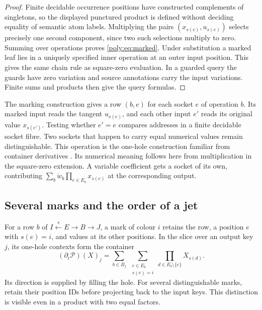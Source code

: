 \documentclass[11pt,a4paper]{article}
\theoremstyle{definition}
\theoremstyle{remark}\newaliascnt{remark}{theorem}
\numberwithin{equation}{section}
\begin{document}
\begin{proof}
Finite decidable occurrence positions have constructed complements
of singletons, so the displayed punctured product is defined without
deciding equality of semantic atom labels. Multiplying the pairs
$(x_{s(e)},u_{s(e)})$ selects precisely one second component, since two
such selections multiply to zero. Summing over operations proves
\eqref{poly:eq:marked}. Under substitution a marked leaf lies in a
uniquely specified inner operation at an outer input position. This
gives the same chain rule as square-zero evaluation. In a guarded
query the guards have zero variation and source annotations carry
the input variations. Finite sums and products then give the query
formulas.
\end{proof}

The marking construction gives a row $(b,e)$ for each socket $e$ of operation $b$. Its marked input reads the tangent $u_{s(e)}$, and each other input $e'$ reads its original value $x_{s(e')}$. Testing whether $e'=e$ compares addresses in a finite decidable socket fibre. Two sockets that happen to carry equal numerical values remain distinguishable. This operation is the one-hole construction familiar from container derivatives \cite{poly:container-derivative}. Its numerical meaning follows here from multiplication in the square-zero extension. A variable coefficient gets a socket of its own, contributing $\sum_b\dot w_b\prod_{e\in E_b}x_{s(e)}$ at the corresponding output.

\subsection{Several marks and the order of a jet}
For a row $b$ of $I\xleftarrow{s}E\to B\to J$, a mark of colour $i$ retains the row, a position $e$ with $s(e)=i$, and values at its other positions. In the slice over an output key $j$, its one-hole contexts form the container
\[
 (\partial_i\mathcal P)(X)_j=
 \sum_{b\in B_j}\ \sum_{\substack{e\in E_b\\s(e)=i}}
                  \prod_{d\in E_b\setminus\{e\}}X_{s(d)} .
\]
Its direction is supplied by filling the hole. For several distinguishable marks, retain their position IDs before projecting back to the input keys. This distinction is visible even in a product with two equal factors.
\end{document}
